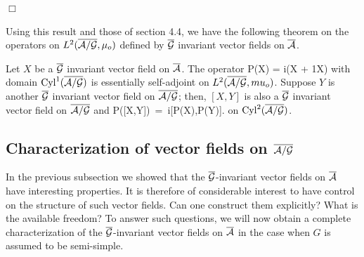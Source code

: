 $\Box$

\bigskip

Using this result and those of section 4.4, we have the following
theorem on the operators on $L^2(\overline{{\cal A}/{\cal G}},\mu_o)$ defined by ${\overline {{\cal G}}}$
invariant vector fields on ${\overline {{\cal A}}}$.

\begin{theorem} Let $X$ be a ${\overline {{\cal G}}}$ invariant vector field on ${\overline {{\cal A}}}$.
The operator 
\be
P(X) \:= i(X + {1}\div X)
\ee
with domain ${\rm Cyl}^1(\overline{{\cal A}/{\cal G}})$ is essentially self-adjoint on $L^2(\overline{{\cal A}/{\cal G}},
mu_o)$.  Suppose $Y$ is another ${\overline {{\cal G}}}$ invariant vector field on
$\overline{{\cal A}/{\cal G}}$; then, $[X,Y]$ is also a ${\overline {{\cal G}}}$ invariant vector field on $\overline{{\cal A}/{\cal G}}$
and
\be
P([X,Y])\ =\ i[P(X),P(Y)].
\ee
on ${\rm Cyl}^2(\overline{{\cal A}/{\cal G}})$.

\end{theorem}
\bigskip\goodbreak  
\subsection{Characterization of vector fields on $\overline{{\cal A}/{\cal G}}$}

In the previous subsection we showed that the ${\overline {{\cal G}}}$-invariant vector
fields on ${\overline {{\cal A}}}$ have interesting properties. It is therefore of
considerable interest to have control on the structure of such vector
fields. Can one construct them explicitly? What is the available
freedom? To answer such questions, we will now obtain a complete
characterization of the ${\overline {{\cal G}}}$-invariant vector fields on ${\overline {{\cal A}}}$
in the case when $G$ is assumed to be semi-simple.

